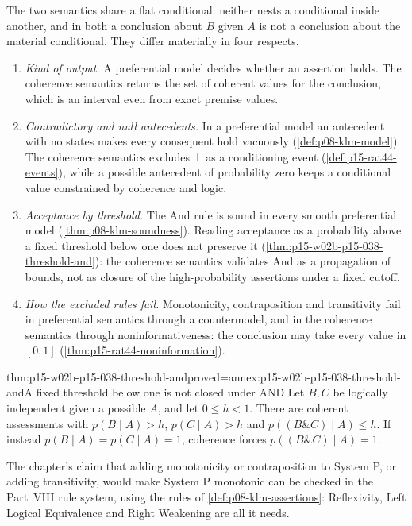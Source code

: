 The two semantics share a flat conditional: neither nests a conditional
inside another, and in both a conclusion about \(B\) given \(A\) is not a
conclusion about the material conditional. They differ materially in
four respects.
\begin{enumerate}
\item \emph{Kind of output.} A preferential model decides whether an
      assertion holds. The coherence semantics returns the set of
      coherent values for the conclusion, which is an interval even from
      exact premise values.
\item \emph{Contradictory and null antecedents.} In a preferential
      model an antecedent with no states makes every consequent hold
      vacuously (\cref{def:p08-klm-model}). The coherence semantics
      excludes \(\bot\) as a conditioning event
      (\cref{def:p15-rat44-events}), while a possible antecedent of
      probability zero keeps a conditional value constrained by
      coherence and logic.
\item \emph{Acceptance by threshold.} The And rule is sound in every
      smooth preferential model (\cref{thm:p08-klm-soundness}). Reading
      acceptance as a probability above a fixed threshold below one does
      not preserve it (\cref{thm:p15-w02b-p15-038-threshold-and}): the
      coherence semantics validates And as a propagation of bounds,
      not as closure of the high-probability assertions under a fixed
      cutoff.
\item \emph{How the excluded rules fail.} Monotonicity, contraposition
      and transitivity fail in preferential semantics through a
      countermodel, and in the coherence semantics through
      noninformativeness: the conclusion may take every value in
      \([0,1]\) (\cref{thm:p15-rat44-noninformation}).
\end{enumerate}

\begin{hbtheorem}{thm:p15-w02b-p15-038-threshold-and}{proved=annex:p15-w02b-p15-038-threshold-and}{A fixed threshold below one is not closed under AND}
Let \(B,C\) be logically independent given a possible \(A\), and let
\(0\leq h<1\). There are coherent assessments with
\(p(B\mid A)>h\), \(p(C\mid A)>h\) and
\(p((B\mathbin{\&}C)\mid A)\leq h\). If instead
\(p(B\mid A)=p(C\mid A)=1\), coherence forces
\(p((B\mathbin{\&}C)\mid A)=1\).
\end{hbtheorem}

The chapter's claim that adding monotonicity or contraposition to
System P, or adding transitivity, would make System P monotonic
\cite[p.~281]{Pfeifer2021ProbabilityLogic} can be checked in the
Part~VIII rule system, using the rules of
\cref{def:p08-klm-assertions}: Reflexivity, Left Logical Equivalence
and Right Weakening are all it needs.

